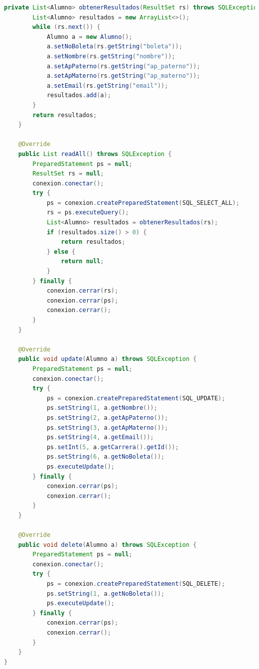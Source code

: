 \documentclass[a4paper,12pt]{article}
\begin{document}
\begin{lstlisting}[language=Java, style=customJava, 
caption={AlumnoDAO.java},captionpos=b,basicstyle=\fontfamily{cmss}\small]
    private List<Alumno> obtenerResultados(ResultSet rs) throws SQLException {
        List<Alumno> resultados = new ArrayList<>();
        while (rs.next()) {
            Alumno a = new Alumno();
            a.setNoBoleta(rs.getString("boleta"));
            a.setNombre(rs.getString("nombre"));
            a.setApPaterno(rs.getString("ap_paterno"));
            a.setApMaterno(rs.getString("ap_materno"));
            a.setEmail(rs.getString("email"));
            resultados.add(a);
        }
        return resultados;
    }

    @Override
    public List readAll() throws SQLException {
        PreparedStatement ps = null;
        ResultSet rs = null;
        conexion.conectar();
        try {
            ps = conexion.createPreparedStatement(SQL_SELECT_ALL);
            rs = ps.executeQuery();
            List<Alumno> resultados = obtenerResultados(rs);
            if (resultados.size() > 0) {
                return resultados;
            } else {
                return null;
            }
        } finally {
            conexion.cerrar(rs);
            conexion.cerrar(ps);
            conexion.cerrar();
        }
    }

    @Override
    public void update(Alumno a) throws SQLException {
        PreparedStatement ps = null;
        conexion.conectar();
        try {
            ps = conexion.createPreparedStatement(SQL_UPDATE);
            ps.setString(1, a.getNombre());
            ps.setString(2, a.getApPaterno());
            ps.setString(3, a.getApMaterno());
            ps.setString(4, a.getEmail());
            ps.setInt(5, a.getCarrera().getId());
            ps.setString(6, a.getNoBoleta());
            ps.executeUpdate();
        } finally {
            conexion.cerrar(ps);
            conexion.cerrar();
        }
    }

    @Override
    public void delete(Alumno a) throws SQLException {
        PreparedStatement ps = null;
        conexion.conectar();
        try {
            ps = conexion.createPreparedStatement(SQL_DELETE);
            ps.setString(1, a.getNoBoleta());
            ps.executeUpdate();
        } finally {
            conexion.cerrar(ps);
            conexion.cerrar();
        }
    }
}
\end{lstlisting}
\end{document}
